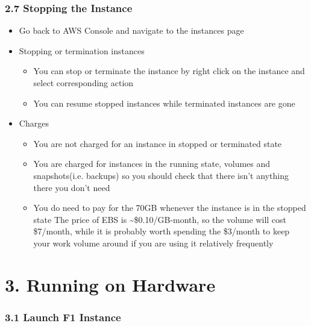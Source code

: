 \documentclass[]{article}
\begin{document}
\hypertarget{header-n389}{%
\subsubsection{2.7 Stopping the Instance}\label{header-n389}}

\begin{itemize}
\item
  Go back to AWS Console and navigate to the instances page
\item
  Stopping or termination instances

  \begin{itemize}
  \item
    You can stop or terminate the instance by right click on the
    instance and select corresponding action
  \item
    You can resume stopped instances while terminated instances are gone
  \end{itemize}
\item
  Charges

  \begin{itemize}
  \item
    You are not charged for an instance in stopped or terminated state
  \item
    You are charged for instances in the running state, volumes and
    snapshots(i.e. backups) so you should check that there isn't
    anything there you don't need
  \item
    You do need to pay for the 70GB whenever the instance is in the
    stopped state The price of EBS is \textasciitilde{}\$0.10/GB-month,
    so the volume will cost \$7/month, while it is probably worth
    spending the \$3/month to keep your work volume around if you are
    using it relatively frequently
  \end{itemize}
\end{itemize}

\hypertarget{header-n420}{%
\section{3. Running on Hardware}\label{header-n420}}

\hypertarget{header-n421}{%
\subsubsection{3.1 Launch F1 Instance}\label{header-n421}}
\end{document}
